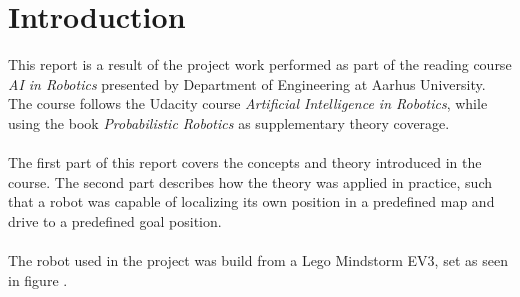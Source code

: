 \chapter{Introduction}
\label{chp:intro}

This report is a result of the project work performed as part of the reading course \emph{AI in Robotics} presented by Department of Engineering at Aarhus University.
The course follows the Udacity course \emph{Artificial Intelligence in Robotics}, while using the book \emph{Probabilistic Robotics} \citep{AIbook} as supplementary theory coverage.\\\\
The first part of this report covers the concepts and theory introduced in the course.
The second part describes how the theory was applied in practice, such that a robot was capable of localizing its own position in a predefined map and drive to a predefined goal position.\\\\
The robot used in the project was build from a Lego Mindstorm EV3, set as seen in figure .
